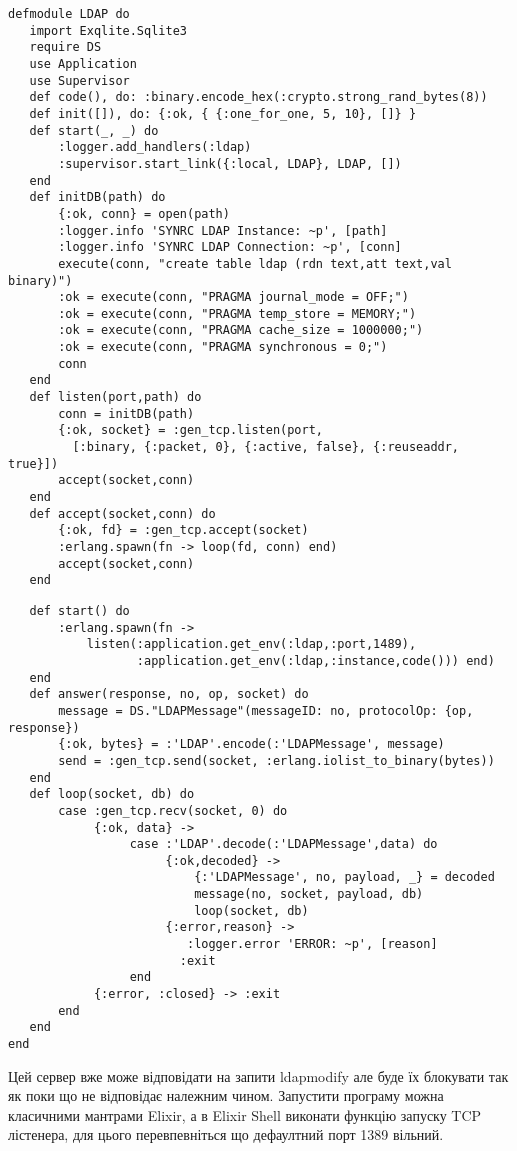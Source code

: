\begin{lstlisting}
defmodule LDAP do
   import Exqlite.Sqlite3
   require DS
   use Application
   use Supervisor
   def code(), do: :binary.encode_hex(:crypto.strong_rand_bytes(8))
   def init([]), do: {:ok, { {:one_for_one, 5, 10}, []} }
   def start(_, _) do
       :logger.add_handlers(:ldap)
       :supervisor.start_link({:local, LDAP}, LDAP, [])
   end
   def initDB(path) do
       {:ok, conn} = open(path)
       :logger.info 'SYNRC LDAP Instance: ~p', [path]
       :logger.info 'SYNRC LDAP Connection: ~p', [conn]
       execute(conn, "create table ldap (rdn text,att text,val binary)")
       :ok = execute(conn, "PRAGMA journal_mode = OFF;")
       :ok = execute(conn, "PRAGMA temp_store = MEMORY;")
       :ok = execute(conn, "PRAGMA cache_size = 1000000;")
       :ok = execute(conn, "PRAGMA synchronous = 0;")
       conn
   end
   def listen(port,path) do
       conn = initDB(path)
       {:ok, socket} = :gen_tcp.listen(port,
         [:binary, {:packet, 0}, {:active, false}, {:reuseaddr, true}])
       accept(socket,conn)
   end
   def accept(socket,conn) do
       {:ok, fd} = :gen_tcp.accept(socket)
       :erlang.spawn(fn -> loop(fd, conn) end)
       accept(socket,conn)
   end
\end{lstlisting}

\newpage
\begin{lstlisting}
   def start() do
       :erlang.spawn(fn ->
           listen(:application.get_env(:ldap,:port,1489),
                  :application.get_env(:ldap,:instance,code())) end)
   end
   def answer(response, no, op, socket) do
       message = DS."LDAPMessage"(messageID: no, protocolOp: {op, response})
       {:ok, bytes} = :'LDAP'.encode(:'LDAPMessage', message)
       send = :gen_tcp.send(socket, :erlang.iolist_to_binary(bytes))
   end
   def loop(socket, db) do
       case :gen_tcp.recv(socket, 0) do
            {:ok, data} ->
                 case :'LDAP'.decode(:'LDAPMessage',data) do
                      {:ok,decoded} ->
                          {:'LDAPMessage', no, payload, _} = decoded
                          message(no, socket, payload, db)
                          loop(socket, db)
                      {:error,reason} ->
                         :logger.error 'ERROR: ~p', [reason]
                        :exit
                 end
            {:error, :closed} -> :exit
       end
   end
end
\end{lstlisting}

Цей сервер вже може відповідати на запити ldapmodify але буде їх блокувати так як поки що не відповідає належним чином. Запустити програму можна класичними мантрами Elixir, а в Elixir Shell виконати функцію запуску TCP лістенера, для цього перевпевніться що дефаултний порт 1389 вільний.

